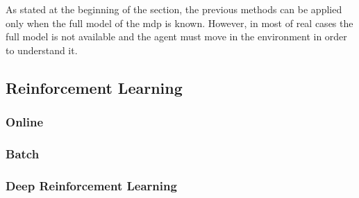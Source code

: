 As stated at the beginning of the section, the previous methods can be applied only when the full model of the \gls{mdp} is known. However, in most of real cases the full model is not available and the agent must move in the environment in order to understand it.

\subsection{Reinforcement Learning}

\subsubsection{Online}

\subsubsection{Batch}

\subsubsection{Deep Reinforcement Learning}
